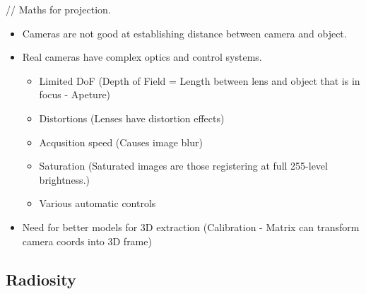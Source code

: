 \documentclass[english, 10pt]{article}
\begin{document}
// Maths for projection.

\begin{itemize}
\item
  Cameras are not good at establishing distance between camera and
  object.
\item
  Real cameras have complex optics and control systems.

  \begin{itemize}
  \itemsep1pt\parskip0pt
  \item
    Limited DoF (Depth of Field = Length between lens and object that is
    in focus - Apeture)
  \item
    Distortions (Lenses have distortion effects)
  \item
    Acqusition speed (Causes image blur)
  \item
    Saturation (Saturated images are those registering at full 255-level
    brightness.)
  \item
    Various automatic controls
  \end{itemize}
\item
  Need for better models for 3D extraction (Calibration - Matrix can
  transform camera coords into 3D frame)
\end{itemize}

\subsection{Radiosity}\label{radiosity}
\end{document}
